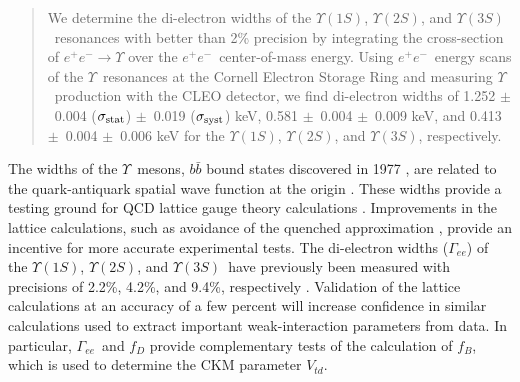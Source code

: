 \documentclass[aps,prl,twocolumn,superscriptaddress,showpacs,floatfix]{revtex4}
\begin{document}

\date{December 21, 2005}

\newcommand{\gee}{$\Gamma_{ee}$}
\newcommand{\ups}{$\Upsilon$}
\newcommand{\us}{$\Upsilon(1S)$}
\newcommand{\uss}{$\Upsilon(2S)$}
\newcommand{\usss}{$\Upsilon(3S)$}
\newcommand{\ee}{$e^+e^-$}
\newcommand{\mm}{$\mu^+\mu^-$}
\newcommand{\tautau}{$\tau^+\tau^-$}
\newcommand{\ellell}{$\ell^+\ell^-$}
\newcommand{\pipi}{$\pi^+\pi^-$}
\newcommand{\PM}{$\pm$}
\newcommand{\inv}{$^{-1}$}
\newcommand{\bmm}{${\mathcal B}_{\mu\mu}$}
\newcommand{\btt}{${\mathcal B}_{\tau\tau}$}
\newcommand{\geehadtot}{\Gamma_{ee}\Gamma_{\mbox{\scriptsize had}}/\Gamma_{\mbox{\scriptsize tot}}}
\newcommand{\pvis}{P_{\mbox{\scriptsize vis}}}
\newcommand{\ppass}{P_{\mbox{\scriptsize pass given vis}}}
\newcommand{\ehtrig}{\epsilon_{\mbox{\scriptsize htrig}}}
\newcommand{\ecuts}{\epsilon_{\mbox{\scriptsize cuts}}}
\newcommand{\chired}{\chi^2_{\mbox{\scriptsize red}}}

\begin{abstract} 
We determine the di-electron widths of the \us, \uss, and \usss\
resonances with better than 2\% precision by integrating the
cross-section of $e^+e^- \to \Upsilon$ over the \ee\ center-of-mass
energy.  Using \ee\ energy scans of the \ups\ resonances at the
Cornell Electron Storage Ring and measuring \ups\ production with the
CLEO detector, we find di-electron widths of
%
1.252 \PM\ 0.004 ($\sigma_{\mbox{\scriptsize stat}}$) \PM\ 0.019 ($\sigma_{\mbox{\scriptsize syst}}$) keV,
0.581 \PM\ 0.004 \PM\ 0.009 keV, and
0.413 \PM\ 0.004 \PM\ 0.006 keV for the \us, \uss, and \usss,
respectively.
\end{abstract}

\maketitle

The widths of the \ups\ mesons, $b\bar{b}$ bound states discovered in
1977 \cite{discovery}, are related to the quark-antiquark spatial wave
function at the origin \cite{wavefunction}.  These widths provide a
testing ground for QCD lattice gauge theory calculations
\cite{lattice}.  Improvements in the lattice calculations, such as
avoidance of the quenched approximation \cite{unquenched}, provide an
incentive for more accurate experimental tests.  The di-electron
widths (\gee) of the \us, \uss, and \usss\ have previously been
measured with precisions of 2.2\%, 4.2\%, and 9.4\%, respectively
\cite{pdg}.  Validation of the lattice calculations at an accuracy of
a few percent will increase confidence in similar calculations used to
extract important weak-interaction parameters from data.  In
particular, \gee\ and $f_D$ \cite{fd} provide complementary tests of
the calculation of $f_B$, which is used to determine the CKM parameter
$V_{td}$.
\end{document}
